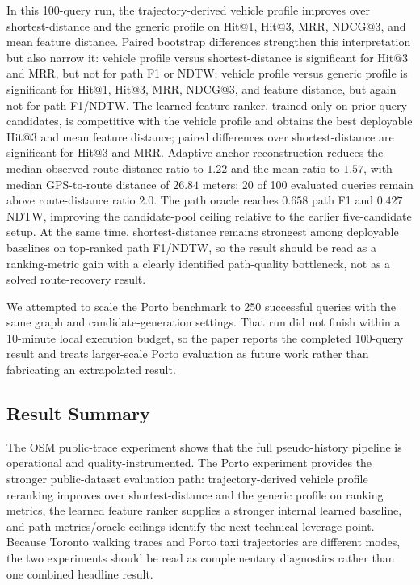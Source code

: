 In this 100-query run, the trajectory-derived vehicle profile improves over shortest-distance and the generic profile on Hit@1, Hit@3, MRR, NDCG@3, and mean feature distance. Paired bootstrap differences strengthen this interpretation but also narrow it: vehicle profile versus shortest-distance is significant for Hit@3 and MRR, but not for path F1 or NDTW; vehicle profile versus generic profile is significant for Hit@1, Hit@3, MRR, NDCG@3, and feature distance, but again not for path F1/NDTW. The learned feature ranker, trained only on prior query candidates, is competitive with the vehicle profile and obtains the best deployable Hit@3 and mean feature distance; paired differences over shortest-distance are significant for Hit@3 and MRR. Adaptive-anchor reconstruction reduces the median observed route-distance ratio to $1.22$ and the mean ratio to $1.57$, with median GPS-to-route distance of $26.84$ meters; 20 of 100 evaluated queries remain above route-distance ratio $2.0$. The path oracle reaches $0.658$ path F1 and $0.427$ NDTW, improving the candidate-pool ceiling relative to the earlier five-candidate setup. At the same time, shortest-distance remains strongest among deployable baselines on top-ranked path F1/NDTW, so the result should be read as a ranking-metric gain with a clearly identified path-quality bottleneck, not as a solved route-recovery result.

We attempted to scale the Porto benchmark to 250 successful queries with the same graph and candidate-generation settings. That run did not finish within a 10-minute local execution budget, so the paper reports the completed 100-query result and treats larger-scale Porto evaluation as future work rather than fabricating an extrapolated result.

\subsection{Result Summary}
The OSM public-trace experiment shows that the full pseudo-history pipeline is operational and quality-instrumented. The Porto experiment provides the stronger public-dataset evaluation path: trajectory-derived vehicle profile reranking improves over shortest-distance and the generic profile on ranking metrics, the learned feature ranker supplies a stronger internal learned baseline, and path metrics/oracle ceilings identify the next technical leverage point. Because Toronto walking traces and Porto taxi trajectories are different modes, the two experiments should be read as complementary diagnostics rather than one combined headline result.
